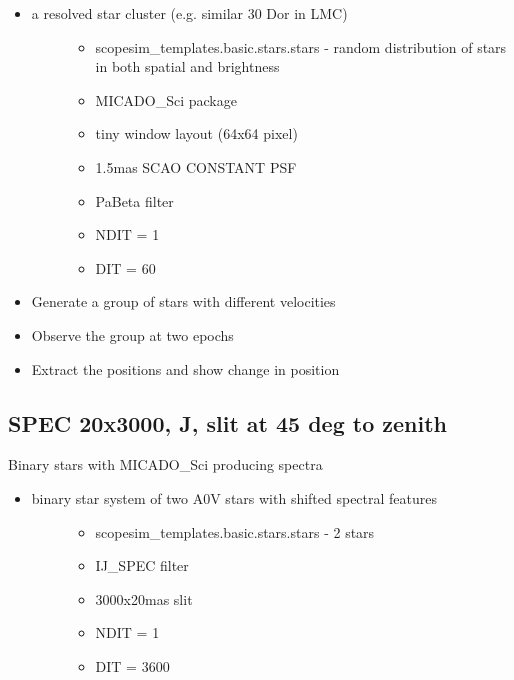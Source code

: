 \begin{itemize}
\item 
\begin{description}
\item[{a resolved star cluster (e.g. similar 30 Dor in LMC)}] \leavevmode 
\begin{itemize}
\item scopesim\_templates.basic.stars.stars - random distribution of stars in both spatial and brightness

\item MICADO\_Sci package

\item tiny window layout (64x64 pixel)

\item 1.5mas SCAO CONSTANT PSF

\item PaBeta filter

\item NDIT = 1

\item DIT = 60
\end{itemize}

\end{description}

\item Generate a group of stars with different velocities

\item Observe the group at two epochs

\item Extract the positions and show change in position
\end{itemize}


\subsection{SPEC 20x3000, J, slit at 45 deg to zenith%
  \label{spec-20x3000-j-slit-at-45-deg-to-zenith}%
}

Binary stars with MICADO\_Sci producing spectra

\begin{itemize}
\item 
\begin{description}
\item[{binary star system of two A0V stars with shifted spectral features}] \leavevmode 
\begin{itemize}
\item scopesim\_templates.basic.stars.stars - 2 stars

\item IJ\_SPEC filter

\item 3000x20mas slit

\item NDIT = 1

\item DIT = 3600
\end{itemize}

\end{description}
\end{itemize}


